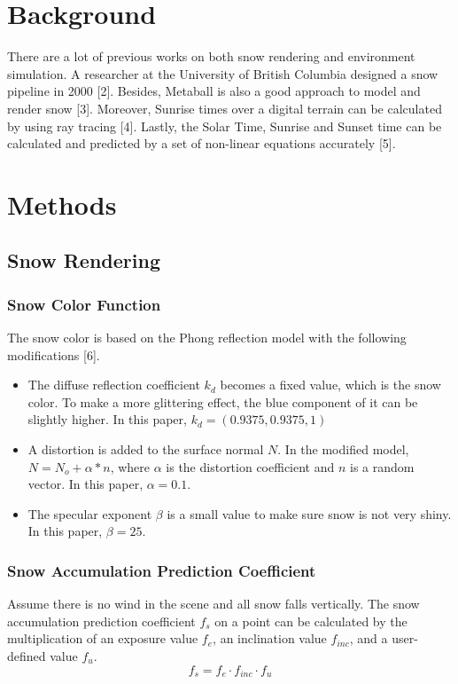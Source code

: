 \documentclass{article}
\begin{document}
\section{Background}
There are a lot of previous works on both snow rendering and environment simulation. A researcher at the University of British 
Columbia designed a snow pipeline in 2000 [2]. Besides, Metaball is also a good approach to model and render snow [3]. Moreover, Sunrise 
times over a digital terrain can be calculated by using ray tracing [4]. Lastly, the Solar Time, Sunrise and Sunset time can be calculated 
and predicted by a set of non-linear equations accurately [5].

\section{Methods}

\subsection{Snow Rendering}

\subsubsection{Snow Color Function}
The snow color is based on the Phong reflection model with the following modifications [6].
\begin{itemize}
  \item The diffuse reflection coefficient \( k_d \) becomes a fixed value, which is the snow color. To make a more glittering effect, the 
  blue component of it can be slightly higher. In this paper, \( k_d = (0.9375, 0.9375, 1)\)
  \item A distortion is added to the surface normal \( N \). In the modified model, \( N = N_{o} + \alpha * n\), where \( \alpha \) is 
  the distortion coefficient and \( n \) is a random vector. In this paper, \( \alpha = 0.1\).
  \item The specular exponent \( \beta \) is a small value to make sure snow is not very shiny. In this paper, \( \beta = 25\).
\end{itemize}

\subsubsection{Snow Accumulation Prediction Coefficient}
Assume there is no wind in the scene and all snow falls vertically. The snow accumulation prediction coefficient \( f_{s} \) on a 
point can be calculated by the multiplication of an exposure value \( f_{e} \), an inclination value \( f_{inc} \), and a user-defined 
value \( f_{u} \).
\[
  f_{s} = f_{e} \cdot f_{inc} \cdot f_{u}
\]
\end{document}
